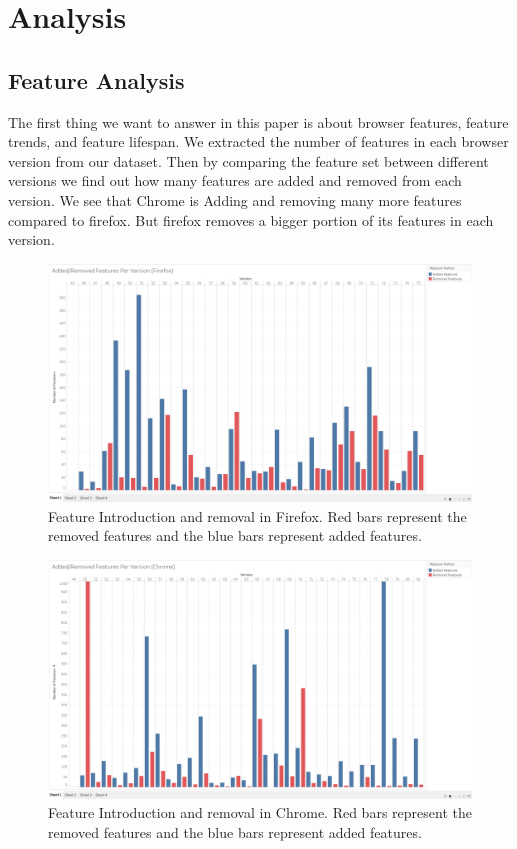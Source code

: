 \section{Analysis}
\label{sec: analysis}

\subsection{Feature Analysis}

The first thing we want to answer in this paper is about browser features, feature trends, and feature lifespan. We extracted the number of features in each browser version from our dataset. Then by comparing the feature set between different versions we find out how many features are added and removed from each version. We see that Chrome is Adding and removing many more features compared to firefox. But firefox removes a bigger portion of its features in each version.


\begin{figure}[ht]
    \centering
    \includegraphics[width=\columnwidth]{figures/Firefox-add-remove.png}
    \caption{Feature Introduction and removal in Firefox. Red bars represent the removed features and the blue bars represent added features.}
    \label{fig:times_bar}
\end{figure}


\begin{figure}[ht]
    \centering
    \includegraphics[width=\columnwidth]{figures/Chrome-add-remove.png}
    \caption{Feature Introduction and removal in Chrome. Red bars represent the removed features and the blue bars represent added features.}
    \label{fig:times_bar}
\end{figure}

